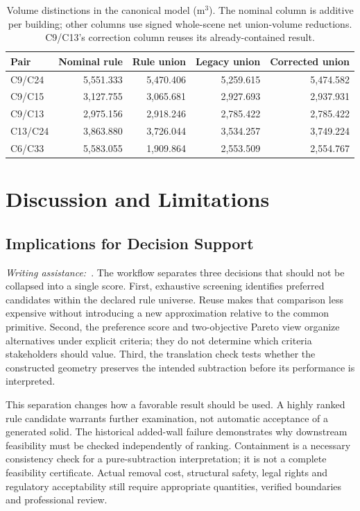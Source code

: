 \documentclass{llncs}
\newcommand{\aidraft}{\textit{Writing assistance:}~\cite{openai2026}. }
\begin{document}
\begin{table}[tbp]
\caption{Volume distinctions in the canonical model (m$^3$). The nominal column is additive per building; other columns use signed whole-scene net union-volume reductions. C9/C13's correction column reuses its already-contained result.}
\label{tab:volumes}\centering
\begin{tabular}{lrrrr}\toprule
Pair & Nominal rule & Rule union & Legacy union & Corrected union\\\midrule
C9/C24 & 5,551.333 & 5,470.406 & 5,259.615 & 5,474.582\\
C9/C15 & 3,127.755 & 3,065.681 & 2,927.693 & 2,937.931\\
C9/C13 & 2,975.156 & 2,918.246 & 2,785.422 & 2,785.422\\
C13/C24 & 3,863.880 & 3,726.044 & 3,534.257 & 3,749.224\\
C6/C33 & 5,583.055 & 1,909.864 & 2,553.509 & 2,554.767\\\bottomrule
\end{tabular}
\end{table}

\FloatBarrier
\section{Discussion and Limitations}
\subsection{Implications for Decision Support}
\aidraft{}The workflow separates three decisions that should not be collapsed into a single score. First, exhaustive screening identifies preferred candidates within the declared rule universe. Reuse makes that comparison less expensive without introducing a new approximation relative to the common primitive. Second, the preference score and two-objective Pareto view organize alternatives under explicit criteria; they do not determine which criteria stakeholders should value. Third, the translation check tests whether the constructed geometry preserves the intended subtraction before its performance is interpreted.

This separation changes how a favorable result should be used. A highly ranked rule candidate warrants further examination, not automatic acceptance of a generated solid. The historical added-wall failure demonstrates why downstream feasibility must be checked independently of ranking. Containment is a necessary consistency check for a pure-subtraction interpretation; it is not a complete feasibility certificate. Actual removal cost, structural safety, legal rights and regulatory acceptability still require appropriate quantities, verified boundaries and professional review.
\end{document}
